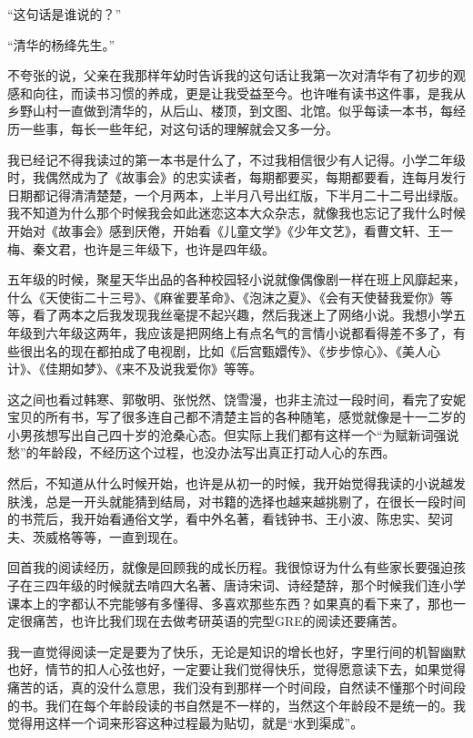 \documentclass[openany,scheme = chinese, linespread = 1.5]{ctexbook}
\begin{document}
“这句话是谁说的？”

“清华的杨绛先生。”

不夸张的说，父亲在我那样年幼时告诉我的这句话让我第一次对清华有了初步的观感和向往，而读书习惯的养成，更是让我受益至今。也许唯有读书这件事，是我从乡野山村一直做到清华的，从后山、楼顶，到文图、北馆。似乎每读一本书，每经历一些事，每长一些年纪，对这句话的理解就会又多一分。

我已经记不得我读过的第一本书是什么了，不过我相信很少有人记得。小学二年级时，我偶然成为了《故事会》的忠实读者，每期都要买，每期都要看，连每月发行日期都记得清清楚楚，一个月两本，上半月八号出红版，下半月二十二号出绿版。我不知道为什么那个时候我会如此迷恋这本大众杂志，就像我也忘记了我什么时候开始对《故事会》感到厌倦，开始看《儿童文学》《少年文艺》，看曹文轩、王一梅、秦文君，也许是三年级下，也许是四年级。

五年级的时候，聚星天华出品的各种校园轻小说就像偶像剧一样在班上风靡起来，什么《天使街二十三号》、《麻雀要革命》、《泡沫之夏》、《会有天使替我爱你》等等，看了两本之后我发现我丝毫提不起兴趣，然后我迷上了网络小说。我想小学五年级到六年级这两年，我应该是把网络上有点名气的言情小说都看得差不多了，有些很出名的现在都拍成了电视剧，比如《后宫甄嬛传》、《步步惊心》、《美人心计》、《佳期如梦》、《来不及说我爱你》等等。

这之间也看过韩寒、郭敬明、张悦然、饶雪漫，也非主流过一段时间，看完了安妮宝贝的所有书，写了很多连自己都不清楚主旨的各种随笔，感觉就像是十一二岁的小男孩想写出自己四十岁的沧桑心态。但实际上我们都有这样一个“为赋新词强说愁”的年龄段，不经历这个过程，也没办法写出真正打动人心的东西。

然后，不知道从什么时候开始，也许是从初一的时候，我开始觉得我读的小说越发肤浅，总是一开头就能猜到结局，对书籍的选择也越来越挑剔了，在很长一段时间的书荒后，我开始看通俗文学，看中外名著，看钱钟书、王小波、陈忠实、契诃夫、茨威格等等，一直到现在。

回首我的阅读经历，就像是回顾我的成长历程。我很惊讶为什么有些家长要强迫孩子在三四年级的时候就去啃四大名著、唐诗宋词、诗经楚辞，那个时候我们连小学课本上的字都认不完能够有多懂得、多喜欢那些东西？如果真的看下来了，那也一定很痛苦，也许比我们现在去做考研英语的完型GRE的阅读还要痛苦。

我一直觉得阅读一定是要为了快乐，无论是知识的增长也好，字里行间的机智幽默也好，情节的扣人心弦也好，一定要让我们觉得快乐，觉得愿意读下去，如果觉得痛苦的话，真的没什么意思，我们没有到那样一个时间段，自然读不懂那个时间段的书。我们在每个年龄段读的书自然是不一样的，当然这个年龄段不是统一的。我觉得用这样一个词来形容这种过程最为贴切，就是“水到渠成”。
\end{document}
